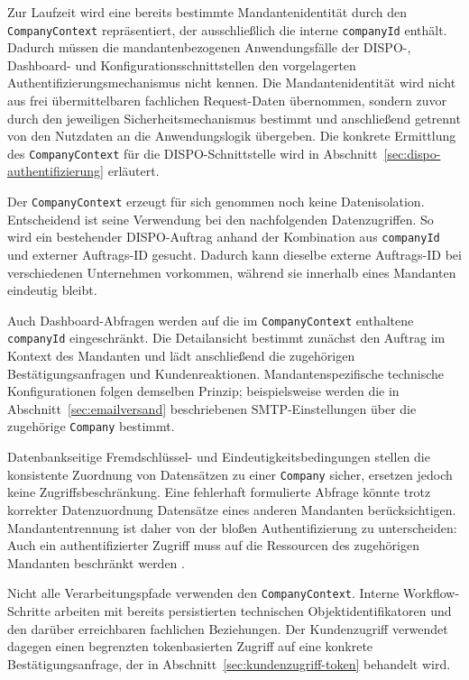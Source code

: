 Zur Laufzeit wird eine bereits bestimmte Mandantenidentität durch den
\texttt{CompanyContext} repräsentiert, der ausschließlich die interne
\texttt{companyId} enthält. Dadurch müssen die mandantenbezogenen
Anwendungsfälle der DISPO-, Dashboard- und Konfigurationsschnittstellen den
vorgelagerten Authentifizierungsmechanismus nicht kennen. Die
Mandantenidentität wird nicht aus frei übermittelbaren fachlichen Request-Daten
übernommen, sondern zuvor durch den jeweiligen Sicherheitsmechanismus bestimmt
und anschließend getrennt von den Nutzdaten an die Anwendungslogik übergeben.
Die konkrete Ermittlung des \texttt{CompanyContext} für die DISPO-Schnittstelle
wird in Abschnitt~\ref{sec:dispo-authentifizierung} erläutert.

Der \texttt{CompanyContext} erzeugt für sich genommen noch keine
Datenisolation. Entscheidend ist seine Verwendung bei den nachfolgenden
Datenzugriffen. So wird ein bestehender DISPO-Auftrag anhand der Kombination aus
\texttt{companyId} und externer Auftrags-ID gesucht. Dadurch kann dieselbe
externe Auftrags-ID bei verschiedenen Unternehmen vorkommen, während sie
innerhalb eines Mandanten eindeutig bleibt.

Auch Dashboard-Abfragen werden auf die im \texttt{CompanyContext} enthaltene
\texttt{companyId} eingeschränkt. Die Detailansicht bestimmt zunächst den
Auftrag im Kontext des Mandanten und lädt anschließend die zugehörigen
Bestätigungsanfragen und Kundenreaktionen. Mandantenspezifische technische
Konfigurationen folgen demselben Prinzip; beispielsweise werden die in
Abschnitt~\ref{sec:emailversand} beschriebenen SMTP-Einstellungen über die
zugehörige \texttt{Company} bestimmt.

Datenbankseitige Fremdschlüssel- und Eindeutigkeitsbedingungen stellen die
konsistente Zuordnung von Datensätzen zu einer \texttt{Company} sicher,
ersetzen jedoch keine Zugriffsbeschränkung. Eine fehlerhaft formulierte Abfrage
könnte trotz korrekter Datenzuordnung Datensätze eines anderen Mandanten
berücksichtigen. Mandantentrennung ist daher von der bloßen Authentifizierung
zu unterscheiden: Auch ein authentifizierter Zugriff muss auf die Ressourcen
des zugehörigen Mandanten beschränkt werden
\parencite{aws2022tenantIsolation}.

Nicht alle Verarbeitungspfade verwenden den \texttt{CompanyContext}. Interne
Workflow-Schritte arbeiten mit bereits persistierten technischen
Objektidentifikatoren und den darüber erreichbaren fachlichen Beziehungen. Der
Kundenzugriff verwendet dagegen einen begrenzten tokenbasierten Zugriff auf
eine konkrete Bestätigungsanfrage, der in
Abschnitt~\ref{sec:kundenzugriff-token} behandelt wird.

